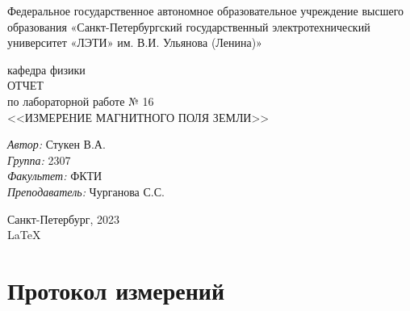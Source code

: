 \documentclass[a4paper,12pt]{report}
\begin{document}
 

\begin{titlepage} 

\begin{center} 

\large Федеральное государственное автономное образовательное учреждение высшего образования «Санкт-Петербургский государственный электротехнический университет «ЛЭТИ» им. В.И. Ульянова (Ленина)»
	
кафедра физики\\[5cm] 


\huge ОТЧЕТ\\ по лабораторной работе № 16\\[0.5cm] 
\large <<ИЗМЕРЕНИЕ МАГНИТНОГО ПОЛЯ ЗЕМЛИ>>\\[3.7cm]

\begin{minipage}{1\textwidth} 
    \begin{flushleft} 
        \emph{Автор:} Стукен В.А.\\
        \emph{Группа:} 2307\\
        \emph{Факультет:} ФКТИ\\
        \emph{Преподаватель:} Чурганова С.С. 
    \end{flushleft} 
\end{minipage} 

\vfill 

Санкт-Петербург, 2023\\
{\large \LaTeX} 

\end{center} 

\thispagestyle{empty} 
\end{titlepage} 


\section*{Протокол измерений}

\begin{flushleft}
    
\end{flushleft}
\newpage
\end{document}

